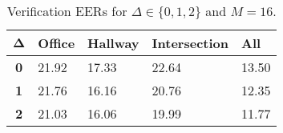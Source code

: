 \begin{table}[h]
    \centering
    \begin{tabular}{|c|M{2cm}|M{2cm}|M{2cm}|M{2cm}|}
    \hline
    $\boldsymbol{\Delta}$ & \bf{Office} & \bf{Hallway} & \bf{Intersection} & \bf{All} \\ 
    \hline 
    \hline
    \bf{0} & 21.92 & 17.33 & 22.64 & 13.50 \\
    \hline
    \bf{1} & 21.76 & 16.16 & 20.76 & 12.35 \\
    \hline
    \bf{2} & 21.03 & 16.06 & 19.99 & 11.77 \\
    \hline
    \end{tabular}
    \caption{Verification EERs for $\Delta \in \{0, 1, 2\}$ and $M = 16$.}
    \label{tab:verify_adapted_wmv_M_16}
\end{table}
